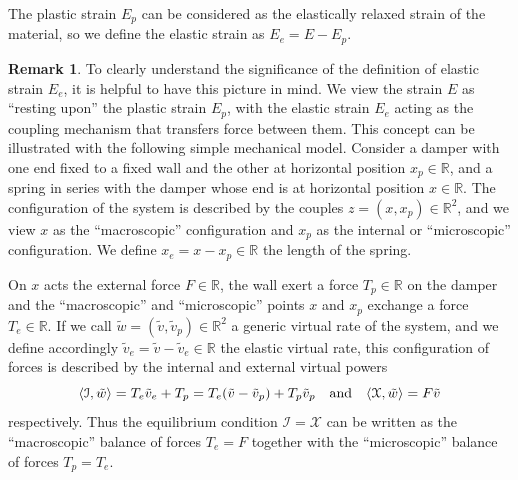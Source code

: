 \documentclass[a4paper,10pt,oneside]{amsbook}
\numberwithin{section}{chapter}
\numberwithin{equation}{chapter}
\theoremstyle{definition}
\newtheorem{rmk}[prop]{Remark}
\DeclarePairedDelimiter{\dual}{\langle}{\rangle}
\begin{document}
The plastic strain $E_p$ can be considered as the elastically relaxed strain of the material, so we define the elastic strain as $E_e=E-E_p$.
\begin{rmk}
\label{rmk:plasticity-simplified}
To clearly understand the significance of the definition of elastic strain $E_e$, it is helpful to have this picture in mind. We view the strain $E$ as ``resting upon'' the plastic strain $E_p$, with the elastic strain $E_e$ acting as the coupling mechanism that transfers force between them. This concept can be illustrated with the following simple mechanical model. Consider a damper with one end fixed to a fixed wall and the other at horizontal position $x_p\in\mathbb{R}$, and a spring in series with the damper whose end is at horizontal position $x\in\mathbb{R}$. The configuration of the system is described by the couples $z=(x,x_p)\in\mathbb{R}^2$, and we view $x$ as the ``macroscopic'' configuration and $x_p$ as the internal or ``microscopic'' configuration. We define $x_e=x-x_p\in\mathbb{R}$ the length of the spring.
\begin{center}
\end{center}
On $x$ acts the external force $F\in\mathbb{R}$, the wall exert a force $T_p\in\mathbb{R}$ on the damper and the ``macroscopic'' and ``microscopic'' points $x$ and $x_p$ exchange a force $T_e\in\mathbb{R}$. If we call $\tilde w=(\tilde v,\tilde v_p)\in\mathbb{R}^2$ a generic virtual rate of the system, and we define accordingly $\tilde v_e=\tilde v-\tilde v_e\in\mathbb{R}$ the elastic virtual rate, this configuration of forces is described by the internal and external virtual powers
\[
\dual{\mathcal{I},\tilde w}=T_e\tilde v_e+T_p=T_e(\tilde v-\tilde v_p)+T_p\tilde v_p\quad\text{and}\quad\dual{\mathcal{X},\tilde w}=F\tilde v
\]
respectively. Thus the equilibrium condition $\mathcal{I}=\mathcal{X}$ can be written as the ``macroscopic'' balance of forces $T_e=F$ together with the ``microscopic'' balance of forces $T_p=T_e$.
\end{rmk}
\end{document}
